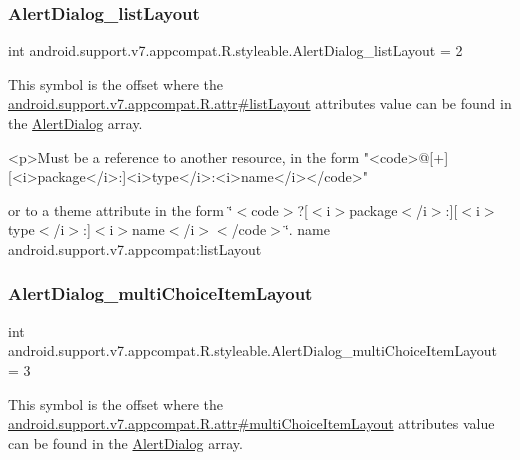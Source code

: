 \subsubsection{\texorpdfstring{Alert\+Dialog\+\_\+list\+Layout}{AlertDialog\_listLayout}}
{\footnotesize\ttfamily int android.\+support.\+v7.\+appcompat.\+R.\+styleable.\+Alert\+Dialog\+\_\+list\+Layout = 2\hspace{0.3cm}{\ttfamily [static]}}

This symbol is the offset where the \hyperlink{classandroid_1_1support_1_1v7_1_1appcompat_1_1R_1_1attr_a39adb57b26d0e68eee700d832de9946a}{android.\+support.\+v7.\+appcompat.\+R.\+attr\#list\+Layout} attribute\textquotesingle{}s value can be found in the \hyperlink{classandroid_1_1support_1_1v7_1_1appcompat_1_1R_1_1styleable_a52dcd4f818920ef336f5b8033a2b34c1}{Alert\+Dialog} array.

\begin{DoxyVerb}      <p>Must be a reference to another resource, in the form "<code>@[+][<i>package</i>:]<i>type</i>:<i>name</i></code>"
\end{DoxyVerb}
 or to a theme attribute in the form \char`\"{}$<$code$>$?\mbox{[}$<$i$>$package$<$/i$>$\+:\mbox{]}\mbox{[}$<$i$>$type$<$/i$>$\+:\mbox{]}$<$i$>$name$<$/i$>$$<$/code$>$\char`\"{}.  name android.\+support.\+v7.\+appcompat\+:list\+Layout \mbox{\label{classandroid_1_1support_1_1v7_1_1appcompat_1_1R_1_1styleable_a9f6edad79aa5567ca37facbfef7f3599}} 
\subsubsection{\texorpdfstring{Alert\+Dialog\+\_\+multi\+Choice\+Item\+Layout}{AlertDialog\_multiChoiceItemLayout}}
{\footnotesize\ttfamily int android.\+support.\+v7.\+appcompat.\+R.\+styleable.\+Alert\+Dialog\+\_\+multi\+Choice\+Item\+Layout = 3\hspace{0.3cm}{\ttfamily [static]}}

This symbol is the offset where the \hyperlink{classandroid_1_1support_1_1v7_1_1appcompat_1_1R_1_1attr_a5478cc4fbc24577eb3dc9e7466d6e426}{android.\+support.\+v7.\+appcompat.\+R.\+attr\#multi\+Choice\+Item\+Layout} attribute\textquotesingle{}s value can be found in the \hyperlink{classandroid_1_1support_1_1v7_1_1appcompat_1_1R_1_1styleable_a52dcd4f818920ef336f5b8033a2b34c1}{Alert\+Dialog} array.

